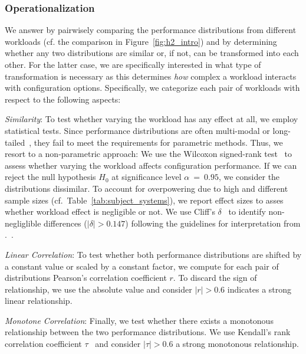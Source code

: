 \subsubsection{Operationalization}
We answer  by pairwisely comparing the performance distributions from different workloads (cf. the comparison in Figure~\ref{fig:h2_intro}) and by determining whether any two distributions are similar or, if not, can be transformed into each other. For the latter case, we are specifically interested in what type of transformation is necessary as this determines \textit{how} complex a workload interacts with configuration options. Specifically, we categorize each pair of workloads with respect to the following aspects: 
\begin{compactenum}
	\item \textit{Similarity}: To test whether varying the workload has any effect at all, we employ statistical tests. Since performance distributions are often multi-modal or long-tailed~\cite{curtsinger_stabilizer_2013,maricq2018taming}, they fail to meet the requirements for parametric methods. 
	Thus, we resort to a non-parametric approach: We use the Wilcoxon signed-rank test~\cite{lovric_international_2010} to assess whether varying the workload affects configuration performance. If we can reject the null hypothesis $H_0$ at significance level $\alpha~=~0.95$, we consider the distributions dissimilar. To account for overpowering due to high and different sample sizes (cf.~Table~\ref{tab:subject_systems}), we report effect sizes to asses whether workload effect is negligible or not. We use Cliff's $\delta$~\cite{Cliff1993DominanceSO} to identify non-negliglible differences ($\vert \delta \vert > 0.147$) following the guidelines for interpretation from \citeauthor{romano2006exploring}.~\cite{romano2006exploring}.
	
	\item \textit{Linear Correlation}: To test whether both performance distributions are shifted by a constant value or scaled by a constant factor, we compute for each pair of distributions Pearson's correlation coefficient $r$. To discard the sign of relationship, we use the absolute value and consider $\vert r\vert >0.6$ indicates a strong linear relationship. 
	
	\item \textit{Monotone Correlation}: Finally, we test whether there exists a monotonous relationship between the two performance distributions. We use Kendall's rank correlation coefficient $\tau$~\cite{kendall1938new} and consider $\vert\tau\vert > 0.6$ a strong monotonous relationship.
\end{compactenum}
